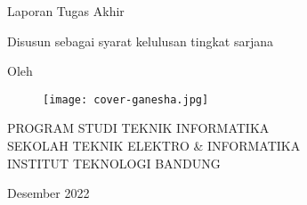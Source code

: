 \clearpage
\pagestyle{empty}

\begin{center}
    \smallskip

    \Large \bfseries \MakeUppercase{\thetitle}
    \vfill

    \Large Laporan Tugas Akhir
    \vfill

    \large Disusun sebagai syarat kelulusan tingkat sarjana
    \vfill

    \large Oleh

    \Large \theauthor

    \vfill
    \begin{figure}[h]
        \centering
        \texttt{[image: cover-ganesha.jpg]}
    \end{figure}
    \vfill

    \large
    \uppercase{
        Program Studi Teknik Informatika \\
        Sekolah Teknik Elektro \& Informatika \\
        Institut Teknologi Bandung
    }

    Desember 2022

\end{center}

\clearpage
